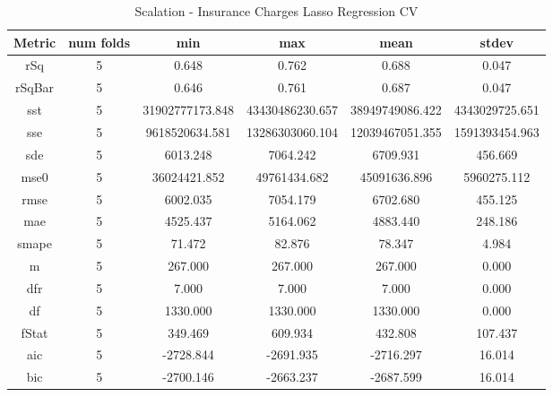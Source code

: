 \documentclass{article}
\begin{document}
\begin{table}[H]
\centering
\caption{Scalation - Insurance Charges Lasso Regression CV}
\label{tab:Scalation - Insurance Charges Lasso Regression CV}
\begin{tabular}{|c|c|c|c|c|c|}\hline
Metric & num folds & min & max & mean & stdev \\ \hline \hline
rSq & 5 & 0.648 & 0.762 & 0.688 & 0.047 \\ \hline
rSqBar & 5 & 0.646 & 0.761 & 0.687 & 0.047 \\ \hline
sst & 5 & 31902777173.848 & 43430486230.657 & 38949749086.422 & 4343029725.651 \\ \hline
sse & 5 & 9618520634.581 & 13286303060.104 & 12039467051.355 & 1591393454.963 \\ \hline
sde & 5 & 6013.248 & 7064.242 & 6709.931 & 456.669 \\ \hline
mse0 & 5 & 36024421.852 & 49761434.682 & 45091636.896 & 5960275.112 \\ \hline
rmse & 5 & 6002.035 & 7054.179 & 6702.680 & 455.125 \\ \hline
mae & 5 & 4525.437 & 5164.062 & 4883.440 & 248.186 \\ \hline
smape & 5 & 71.472 & 82.876 & 78.347 & 4.984 \\ \hline
m & 5 & 267.000 & 267.000 & 267.000 & 0.000 \\ \hline
dfr & 5 & 7.000 & 7.000 & 7.000 & 0.000 \\ \hline
df & 5 & 1330.000 & 1330.000 & 1330.000 & 0.000 \\ \hline
fStat & 5 & 349.469 & 609.934 & 432.808 & 107.437 \\ \hline
aic & 5 & -2728.844 & -2691.935 & -2716.297 & 16.014 \\ \hline
bic & 5 & -2700.146 & -2663.237 & -2687.599 & 16.014 \\ \hline
\end{tabular}
\end{table}
\end{document}
